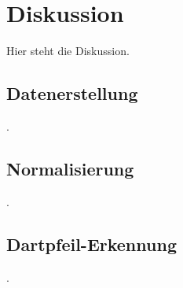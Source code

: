 
\chapter{Diskussion}
\label{cha:diskussion}

Hier steht die Diskussion.

\section{Datenerstellung}
\label{sec:diskussion:daten}

.

\section{Normalisierung}
\label{sec:diskussion:cv}

.

\section{Dartpfeil-Erkennung}
\label{sec:diskussion:ki}

. 
